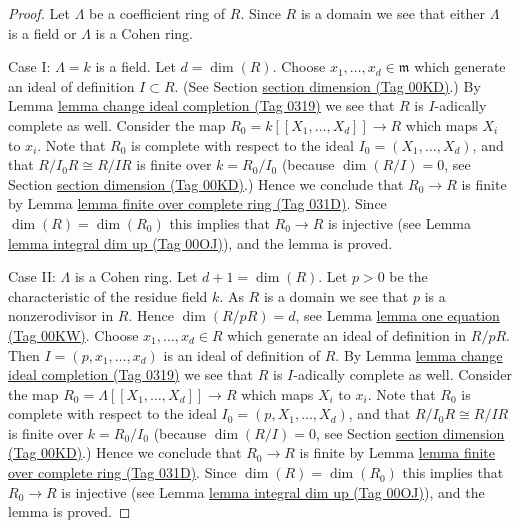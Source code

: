 \documentclass{amsart}
\theoremstyle{plain}
\theoremstyle{definition}
\theoremstyle{remark}
\numberwithin{equation}{subsection}
\begin{document}
\begin{proof}
Let $\Lambda$ be a coefficient ring of $R$.
Since $R$ is a domain we see that either $\Lambda$ is a field
or $\Lambda$ is a Cohen ring.

\medskip\noindent
Case I: $\Lambda = k$ is a field. Let $d = \dim(R)$.
Choose $x_1, \ldots, x_d \in \mathfrak m$
which generate an ideal of definition $I \subset R$.
(See Section \href{https://stacks.math.columbia.edu/tag/00KD}{section dimension (Tag 00KD)}.)
By Lemma \href{https://stacks.math.columbia.edu/tag/0319}{lemma change ideal completion (Tag 0319)} we see that $R$
is $I$-adically complete as well.
Consider the map $R_0 = k[[X_1, \ldots, X_d]] \to R$
which maps $X_i$ to $x_i$.
Note that $R_0$ is complete with respect to the ideal
$I_0 = (X_1, \ldots, X_d)$,
and that $R/I_0R \cong R/IR$ is finite over $k = R_0/I_0$
(because $\dim(R/I) = 0$, see Section \href{https://stacks.math.columbia.edu/tag/00KD}{section dimension (Tag 00KD)}.)
Hence we conclude that $R_0 \to R$ is finite by
Lemma \href{https://stacks.math.columbia.edu/tag/031D}{lemma finite over complete ring (Tag 031D)}.
Since $\dim(R) = \dim(R_0)$ this implies that
$R_0 \to R$ is injective (see Lemma \href{https://stacks.math.columbia.edu/tag/00OJ}{lemma integral dim up (Tag 00OJ)}),
and the lemma is proved.

\medskip\noindent
Case II: $\Lambda$ is a Cohen ring. Let $d + 1 = \dim(R)$.
Let $p > 0$ be the characteristic of the residue field $k$.
As $R$ is a domain we see that $p$ is a nonzerodivisor in $R$.
Hence $\dim(R/pR) = d$, see Lemma \href{https://stacks.math.columbia.edu/tag/00KW}{lemma one equation (Tag 00KW)}.
Choose $x_1, \ldots, x_d \in R$
which generate an ideal of definition in $R/pR$.
Then $I = (p, x_1, \ldots, x_d)$ is an ideal of definition of $R$.
By Lemma \href{https://stacks.math.columbia.edu/tag/0319}{lemma change ideal completion (Tag 0319)} we see that $R$
is $I$-adically complete as well.
Consider the map $R_0 = \Lambda[[X_1, \ldots, X_d]] \to R$
which maps $X_i$ to $x_i$.
Note that $R_0$ is complete with respect to the ideal
$I_0 = (p, X_1, \ldots, X_d)$,
and that $R/I_0R \cong R/IR$ is finite over $k = R_0/I_0$
(because $\dim(R/I) = 0$, see Section \href{https://stacks.math.columbia.edu/tag/00KD}{section dimension (Tag 00KD)}.)
Hence we conclude that $R_0 \to R$ is finite by
Lemma \href{https://stacks.math.columbia.edu/tag/031D}{lemma finite over complete ring (Tag 031D)}.
Since $\dim(R) = \dim(R_0)$ this implies that
$R_0 \to R$ is injective (see Lemma \href{https://stacks.math.columbia.edu/tag/00OJ}{lemma integral dim up (Tag 00OJ)}),
and the lemma is proved.
\end{proof}
\end{document}
